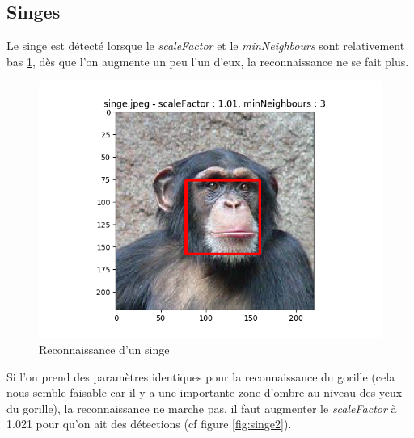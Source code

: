 \documentclass[a4paper,11pt]{article}
\begin{document}
    
    \subsection{Singes}

	Le singe est détecté lorsque le	\textit{scaleFactor} et le \textit{minNeighbours} sont
	relativement bas \ref{fig:singe}, dès que l'on augmente un peu l'un d'eux, la reconnaissance
	ne se fait plus.

	\begin{figure}[H]
	    \begin{center}
		\includegraphics[scale = 0.6]{images/singe_1,01_3.png}
		\caption{Reconnaissance d'un singe}
		\label{fig:singe}
	    \end{center}
	\end{figure}

	Si l'on prend des paramètres identiques pour la reconnaissance du gorille (cela nous semble
	faisable car il y a une importante zone d'ombre au niveau des yeux du gorille), la
	reconnaissance ne marche pas, il faut augmenter le \textit{scaleFactor} à 1.021 pour qu'on
	ait des détections (cf figure \ref{fig:singe2}).
\end{document}
